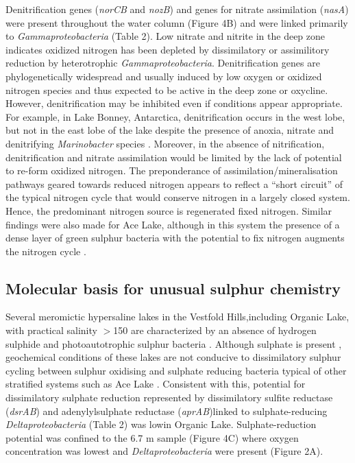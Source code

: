 Denitrification genes (\emph{norCB} and \emph{nozB}) and genes for nitrate assimilation (\emph{nasA}) were present throughout the water column (Figure 4B) and were linked primarily to \emph{Gammaproteobacteria} (Table 2). 
Low nitrate and nitrite in the deep zone  indicates oxidized nitrogen has been depleted by dissimilatory or assimilitory reduction by heterotrophic \emph{Gammaproteobacteria}. 
Denitrification genes are phylogenetically widespread and usually induced by low oxygen or oxidized nitrogen species \cite{Kraft2011} and thus expected to be active in the deep zone or oxycline. 
However, denitrification may be inhibited even if conditions appear appropriate. 
For example, in Lake Bonney, Antarctica, denitrification occurs in the west lobe, but not in the east lobe of the lake despite the presence of anoxia, nitrate and denitrifying \emph{Marinobacter} species \cite{Ward1997, Ward2005}.
 Moreover, in the absence of nitrification, denitrification and nitrate assimilation would be limited by the lack of potential to re-form oxidized nitrogen. 
The preponderance of assimilation/mineralisation pathways geared towards reduced nitrogen appears to reflect a ``short circuit'' of the typical nitrogen cycle that would conserve nitrogen in a largely closed system. 
Hence, the predominant nitrogen source is regenerated fixed nitrogen.
Similar findings were also made for Ace Lake, although in this system the presence of a dense layer of green sulphur bacteria with the potential to fix nitrogen augments the nitrogen cycle \cite{Lauro2011}. 

\subsection{Molecular basis for unusual sulphur chemistry}
Several meromictic hypersaline lakes in the Vestfold Hills,including Organic Lake, with practical salinity $>$150 are characterized by an absence of hydrogen sulphide and photoautotrophic sulphur bacteria \cite{Burke1988}. 
Although sulphate is present \cite{Franzmann1987b}, geochemical conditions of these lakes are not conducive to dissimilatory sulphur cycling between sulphur oxidising and sulphate reducing bacteria typical of other stratified systems such as Ace Lake \cite{Ng2010a, Lauro2011}. 
Consistent with this, potential for dissimilatory sulphate reduction represented by dissimilatory sulfite reductase (\emph{dsrAB}) and adenylylsulphate reductase (\emph{aprAB})linked to sulphate-reducing \emph{Deltaproteobacteria} (Table 2) was lowin Organic Lake. 
Sulphate-reduction potential was confined to the 6.7 m sample (Figure 4C) where oxygen concentration was lowest and \emph{Deltaproteobacteria} were present (Figure 2A).

